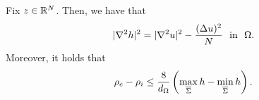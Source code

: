 \documentclass[a4paper,10pt]{amsart}
\numberwithin{equation}{section}
\begin{document}
\begin{lem}
\label{lem:relation_osc_rhoe-rhoi e Hess h}
Fix $z\in\mathbb{R}^N$. Then, we have that
\begin{equation*}
|\nabla^2 h|^2 = | \nabla^2 u|^2- \frac{(\Delta u)^2}{N} \ \text{ in } \ \Omega .
\end{equation*}	
Moreover, it holds that 
\begin{equation}
\label{eq:rhoe-rhoi stima cone}
	\rho_e - \rho_i \le	\frac{8}{d_\Omega} \left( \max_{ \overline{\Sigma} } h - \min_{ \overline{\Sigma}} h \right).
\end{equation}
\end{lem}
%		
\end{document}
